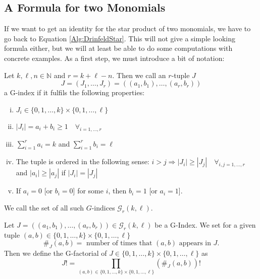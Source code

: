 %

\subsection{A Formula for two Monomials}

If we want to get an identity for the star product of two monomials, we have 
to go back to Equation \eqref{Alg:DrinfeldStar}. This will not give a simple 
looking formula either, but we will at least be able to do some 
computations with concrete examples. As a first step, we must introduce 
a bit of notation:
\begin{definition}[G-Index]
	\label{Def:GuttIndex}
	Let $k, \ell, n \in \mathbb{N}$ and $r = k + \ell - n$. 
	Then we call an $r$-tuple $J$
	\begin{equation*}
		J = (J_1, \ldots, J_r) 
		= 
		((a_1, b_1), \ldots, (a_r, b_r)) 
	\end{equation*}
  	a G-index if it fulfils the following properties:
	\begin{enumerate}[(i)]
		\item
		$J_i \in \{0, 1, \ldots, k\} \times \{0, 1, \ldots, \ell\}$
		
  		\item 
		$|J_i| 
		= 
		a_i + b_i \geq 1 
		\quad \forall_{i = 1, \ldots, r}$
		
		\item 
		$\sum\limits_{i=1}^{r} a_i = k$ 
		and 
		$\sum\limits_{i=1}^{r} b_i = \ell$
		
		\item
		The tuple is ordered in the following sense:
		$i>j \Rightarrow |J_i| \geq |J_j| \quad \forall_{i,j = 1, 
		\ldots, r}$ and $|a_i| \geq |a_j|$ if $|J_i| = |J_j|$
		
		\item 
		If $a_i = 0$ [or $b_i = 0$] for some $i$, 
		then $b_i = 1$ [or $a_i = 1$].
	\end{enumerate}
	We call the set of all such $G$-indices	$\mathcal{G}_r(k,\ell)$.
\end{definition}
\begin{definition}[G-Factorial]
	\label{Def:GuttFactorial}
	Let $J = ((a_1, b_1), \ldots, (a_r, b_r)) \in \mathcal{G}_r(k,
	\ell)$ be a G-Index. We set for a given tuple $(a,b) \in \{0, 1, 
	\ldots, k\} \times \{0, 1, \ldots, \ell\}$
	\begin{equation*}
		\#_J (a,b)
		= 
		\textrm{ number of times that $(a,b)$ appears in } J.
	\end{equation*}
	Then we define the G-factorial of $J \in \{0, 1, \ldots, k\} \times 
	\{0, 1, \ldots, \ell\}$ as
	\begin{equation*}
		J!
		= 
		\prod\limits_{
			(a,b) \in 
			\{0, 1, \ldots, k\} 
			\times 
			\{0, 1, \ldots, \ell\}
		}
		\left( \#_J (a,b) \right)!
	\end{equation*}
\end{definition}
